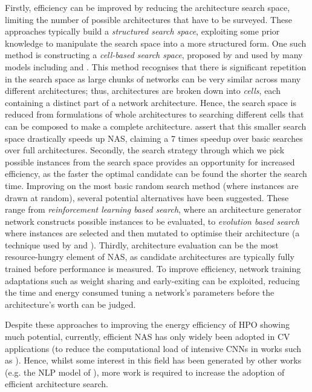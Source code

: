 \documentclass[a4paper, 12pt]{article}
\begin{document}
    Firstly, efficiency can be improved by reducing the architecture search space, limiting the number of possible architectures that have to be surveyed. These approaches typically build a \emph{structured search space}, exploiting some prior knowledge to manipulate the search space into a more structured form. One such method is constructing a \emph{cell-based search space}, proposed by \citet{zoph-2018} and used by many models including \citet{liu-2019} and \citet{real-2019}. This method recognises that there is significant repetition in the search space as large chunks of networks can be very similar across many different architectures; thus, architectures are broken down into \emph{cells}, each containing a distinct part of a network architecture. Hence, the search space is reduced from formulations of whole architectures to searching different cells that can be composed to make a complete architecture. \citet{zoph-2018} assert that this smaller search space drastically speeds up NAS, claiming a 7 times speedup over basic searches over full architectures. Secondly, the search strategy through which we pick possible instances from the search space provides an opportunity for increased efficiency, as the faster the optimal candidate can be found the shorter the search time. Improving on the most basic random search method (where instances are drawn at random), several potential alternatives have been suggested. These range from \emph{reinforcement learning based search}, where an architecture generator network constructs possible instances to be evaluated, to \emph{evolution based search} where instances are selected and then mutated to optimise their architecture (a technique used by \citet{so-2019} and \citet{real-2019}). Thirdly, architecture evaluation can be the most resource-hungry element of NAS, as candidate architectures are typically fully trained before performance is measured. To improve efficiency, network training adaptations such as weight sharing and early-exiting can be exploited, reducing the time and energy consumed tuning a network's parameters before the architecture's worth can be judged. 
    
    Despite these approaches to improving the energy efficiency of HPO showing much potential, currently, efficient NAS has only widely been adopted in CV applications (to reduce the computational load of intensive CNNs in works such as \citet{real-2019}). Hence, whilst some interest in this field has been generated by other works (e.g. the NLP model of \citet{so-2019}), more work is required to increase the adoption of efficient architecture search.
\end{document}
